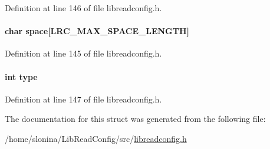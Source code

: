 Definition at line 146 of file libreadconfig.h.\hypertarget{struct_l_r_c__config_types_a4754d9e0429a1914e3617de872b4a736}{
\paragraph[{space}]{\setlength{\rightskip}{0pt plus 5cm}char {\bf space}\mbox{[}LRC\_\-MAX\_\-SPACE\_\-LENGTH\mbox{]}}\hfill}
\label{struct_l_r_c__config_types_a4754d9e0429a1914e3617de872b4a736}


Definition at line 145 of file libreadconfig.h.\hypertarget{struct_l_r_c__config_types_ac765329451135abec74c45e1897abf26}{
\paragraph[{type}]{\setlength{\rightskip}{0pt plus 5cm}int {\bf type}}\hfill}
\label{struct_l_r_c__config_types_ac765329451135abec74c45e1897abf26}


Definition at line 147 of file libreadconfig.h.

The documentation for this struct was generated from the following file:\begin{DoxyCompactItemize}
\item 
/home/slonina/LibReadConfig/src/\hyperlink{libreadconfig_8h}{libreadconfig.h}\end{DoxyCompactItemize}
